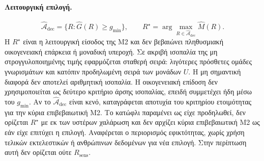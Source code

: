 \documentclass[11pt,a4paper]{article}
\begin{document}
\paragraph{Λειτουργική επιλογή.}
\[
\widehat{\mathcal A}_{\mathrm{dec}}
 =\{R:\widehat G(R)\geq g_{\min}\},
\qquad
R^\star
 =\arg\max_{R\in\widehat{\mathcal A}_{\mathrm{dec}}}\widehat M(R).
\]
Η \(R^\star\) είναι η λειτουργική είσοδος της M2 και δεν βεβαιώνει πληθυσμιακή οικογενειακή επάρκεια ή μοναδική υπεροχή. Σε ακριβή ισοπαλία της μη στρογγυλοποιημένης τιμής εφαρμόζεται σταθερή σειρά: λιγότερες πρόσθετες ομάδες γνωρισμάτων και κατόπιν προδηλωμένη σειρά των μονάδων \(U\). Η μη σημαντική διαφορά δεν αποτελεί αριθμητική ισοπαλία. Η οικογενειακή επίδοση δεν χρησιμοποιείται ως δεύτερο κριτήριο άρσης ισοπαλίας, επειδή συμμετέχει ήδη μέσω του \(g_{\min}\). Αν το \(\widehat{\mathcal A}_{\mathrm{dec}}\) είναι κενό, καταγράφεται αποτυχία του κριτηρίου ετοιμότητας για την κύρια επιβεβαιωτική M2. Το κατώφλι παραμένει ως είχε προδηλωθεί, δεν ορίζεται \(R^\star\) με εκ των υστέρων χαλάρωση και δεν αρχίζει κύρια επιβεβαιωτική M2 ως εάν είχε επιτύχει η επιλογή. Αναφέρεται ο περιορισμός εφικτότητας, χωρίς χρήση τελικών εκτελεστικών ή ανθρώπινων δεδομένων για νέα επιλογή. Στην περίπτωση αυτή δεν ορίζεται ούτε \(R_{\mathrm{sens}}\).
\end{document}
